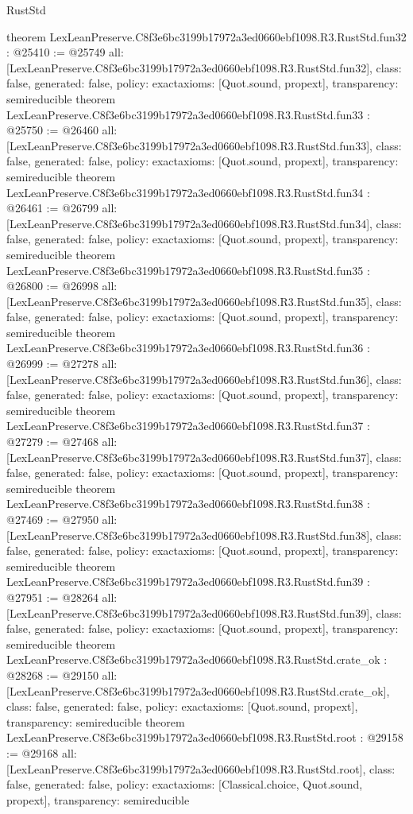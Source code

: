 \begin{lexlean}{RustStd}
\begin{coremodule}
{}
theorem LexLeanPreserve.C8f3e6bc3199b17972a3ed0660ebf1098.R3.RustStd.fun32 : @25410 := @25749 {
  all: [LexLeanPreserve.C8f3e6bc3199b17972a3ed0660ebf1098.R3.RustStd.fun32],
  class: false,
  generated: false,
  policy: exact{axioms: [Quot.sound, propext]},
  transparency: semireducible
}
theorem LexLeanPreserve.C8f3e6bc3199b17972a3ed0660ebf1098.R3.RustStd.fun33 : @25750 := @26460 {
  all: [LexLeanPreserve.C8f3e6bc3199b17972a3ed0660ebf1098.R3.RustStd.fun33],
  class: false,
  generated: false,
  policy: exact{axioms: [Quot.sound, propext]},
  transparency: semireducible
}
theorem LexLeanPreserve.C8f3e6bc3199b17972a3ed0660ebf1098.R3.RustStd.fun34 : @26461 := @26799 {
  all: [LexLeanPreserve.C8f3e6bc3199b17972a3ed0660ebf1098.R3.RustStd.fun34],
  class: false,
  generated: false,
  policy: exact{axioms: [Quot.sound, propext]},
  transparency: semireducible
}
theorem LexLeanPreserve.C8f3e6bc3199b17972a3ed0660ebf1098.R3.RustStd.fun35 : @26800 := @26998 {
  all: [LexLeanPreserve.C8f3e6bc3199b17972a3ed0660ebf1098.R3.RustStd.fun35],
  class: false,
  generated: false,
  policy: exact{axioms: [Quot.sound, propext]},
  transparency: semireducible
}
theorem LexLeanPreserve.C8f3e6bc3199b17972a3ed0660ebf1098.R3.RustStd.fun36 : @26999 := @27278 {
  all: [LexLeanPreserve.C8f3e6bc3199b17972a3ed0660ebf1098.R3.RustStd.fun36],
  class: false,
  generated: false,
  policy: exact{axioms: [Quot.sound, propext]},
  transparency: semireducible
}
theorem LexLeanPreserve.C8f3e6bc3199b17972a3ed0660ebf1098.R3.RustStd.fun37 : @27279 := @27468 {
  all: [LexLeanPreserve.C8f3e6bc3199b17972a3ed0660ebf1098.R3.RustStd.fun37],
  class: false,
  generated: false,
  policy: exact{axioms: [Quot.sound, propext]},
  transparency: semireducible
}
theorem LexLeanPreserve.C8f3e6bc3199b17972a3ed0660ebf1098.R3.RustStd.fun38 : @27469 := @27950 {
  all: [LexLeanPreserve.C8f3e6bc3199b17972a3ed0660ebf1098.R3.RustStd.fun38],
  class: false,
  generated: false,
  policy: exact{axioms: [Quot.sound, propext]},
  transparency: semireducible
}
theorem LexLeanPreserve.C8f3e6bc3199b17972a3ed0660ebf1098.R3.RustStd.fun39 : @27951 := @28264 {
  all: [LexLeanPreserve.C8f3e6bc3199b17972a3ed0660ebf1098.R3.RustStd.fun39],
  class: false,
  generated: false,
  policy: exact{axioms: [Quot.sound, propext]},
  transparency: semireducible
}
theorem LexLeanPreserve.C8f3e6bc3199b17972a3ed0660ebf1098.R3.RustStd.crate_ok : @28268 := @29150 {
  all: [LexLeanPreserve.C8f3e6bc3199b17972a3ed0660ebf1098.R3.RustStd.crate_ok],
  class: false,
  generated: false,
  policy: exact{axioms: [Quot.sound, propext]},
  transparency: semireducible
}
theorem LexLeanPreserve.C8f3e6bc3199b17972a3ed0660ebf1098.R3.RustStd.root : @29158 := @29168 {
  all: [LexLeanPreserve.C8f3e6bc3199b17972a3ed0660ebf1098.R3.RustStd.root],
  class: false,
  generated: false,
  policy: exact{axioms: [Classical.choice, Quot.sound, propext]},
  transparency: semireducible
}


\end{coremodule}
\end{lexlean}
